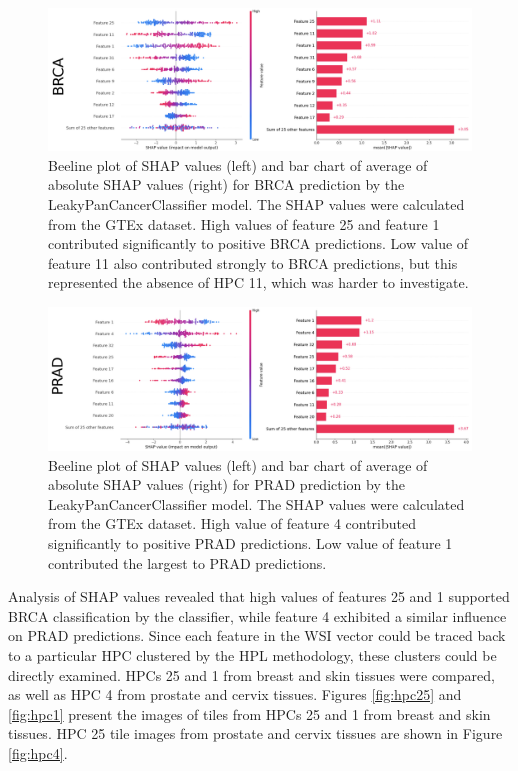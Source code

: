 \documentclass{l4proj}
\begin{document}
\begin{figure}[h]
    \centering
    \includegraphics[width=1\linewidth]{images/brca-shap.png}
    \caption{Beeline plot of SHAP values (left) and bar chart of average of absolute SHAP values (right) for BRCA prediction by the LeakyPanCancerClassifier model. The SHAP values were calculated from the GTEx dataset. High values of feature 25 and feature 1 contributed significantly to positive BRCA predictions. Low value of feature 11 also contributed strongly to BRCA predictions, but this represented the absence of HPC 11, which was harder to investigate.}
    \label{fig:shap-brca}
\end{figure}

\begin{figure}[h]
    \centering
    \includegraphics[width=1\linewidth]{images/prad-shap.png}
    \caption{Beeline plot of SHAP values (left) and bar chart of average of absolute SHAP values (right) for PRAD prediction by the LeakyPanCancerClassifier model. The SHAP values were calculated from the GTEx dataset. High value of feature 4 contributed significantly to positive PRAD predictions. Low value of feature 1 contributed the largest to PRAD predictions.}
    \label{fig:shap-prad}
\end{figure}

Analysis of SHAP values revealed that high values of features 25 and 1 supported BRCA classification by the classifier, while feature 4 exhibited a similar influence on PRAD predictions. Since each feature in the WSI vector could be traced back to a particular HPC clustered by the HPL methodology, these clusters could be directly examined. HPCs 25 and 1 from breast and skin tissues were compared, as well as HPC 4 from prostate and cervix tissues. Figures \ref{fig:hpc25} and \ref{fig:hpc1} present the images of tiles from HPCs 25 and 1 from breast and skin tissues. HPC 25 tile images from prostate and cervix tissues are shown in Figure \ref{fig:hpc4}.
\end{document}
